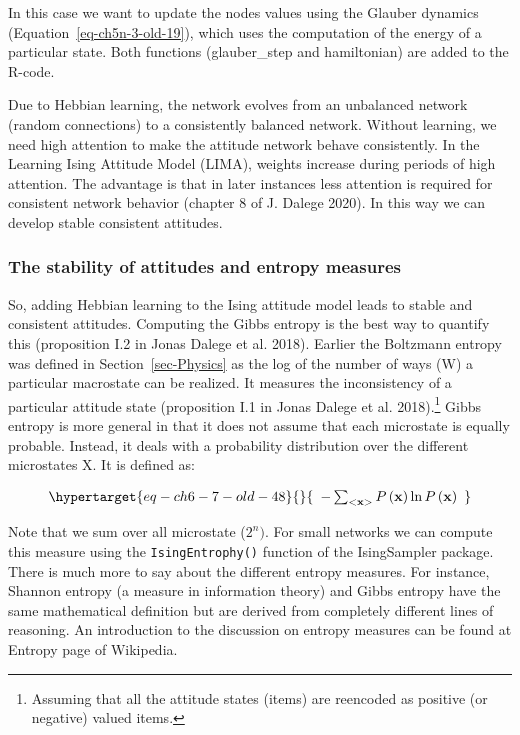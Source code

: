 \documentclass[
  a4paper,
  DIV=11,
  numbers=noendperiod]{scrreprt}
\begin{document}
In this case we want to update the nodes values using the Glauber
dynamics (Equation~\ref{eq-ch5n-3-old-19}), which uses the computation
of the energy of a particular state. Both functions (glauber\_step and
hamiltonian) are added to the R-code.

Due to Hebbian learning, the network evolves from an unbalanced network
(random connections) to a consistently balanced network. Without
learning, we need high attention to make the attitude network behave
consistently. In the Learning Ising Attitude Model (LIMA), weights
increase during periods of high attention. The advantage is that in
later instances less attention is required for consistent network
behavior (chapter 8 of J. Dalege 2020). In this way we can develop
stable consistent attitudes.

\hypertarget{sec-The-stability-of-attitudes-and-entropy-measures}{%
\subsubsection{The stability of attitudes and entropy
measures}\label{sec-The-stability-of-attitudes-and-entropy-measures}}

So, adding Hebbian learning to the Ising attitude model leads to stable
and consistent attitudes. Computing the Gibbs entropy is the best way to
quantify this (proposition I.2 in Jonas Dalege et al. 2018). Earlier the
Boltzmann entropy was defined in Section~\ref{sec-Physics} as the log of
the number of ways (W) a particular macrostate can be realized. It
measures the inconsistency of a particular attitude state (proposition
I.1 in Jonas Dalege et al. 2018).\footnote{Assuming that all the
  attitude states (items) are reencoded as positive (or negative) valued
  items.} Gibbs entropy is more general in that it does not assume that
each microstate is equally probable. Instead, it deals with a
probability distribution over the different microstates X. It is defined
as:

\begin{equation}\protect\hypertarget{eq-ch6-7-old-48}{}{\begin{array}{r}
 - \sum_{< \mathbf{x} >}^{}{P\left( \mathbf{x} \right)\ln{P\left( \mathbf{x} \right)}}
\end{array}}\label{eq-ch6-7-old-48}\end{equation}

Note that we sum over all microstate (\(2^{n})\). For small networks we
can compute this measure using the \texttt{IsingEntrophy()} function of
the IsingSampler package. There is much more to say about the different
entropy measures. For instance, Shannon entropy (a measure in
information theory) and Gibbs entropy have the same mathematical
definition but are derived from completely different lines of reasoning.
An introduction to the discussion on entropy measures can be found at
Entropy page of Wikipedia.
\end{document}
